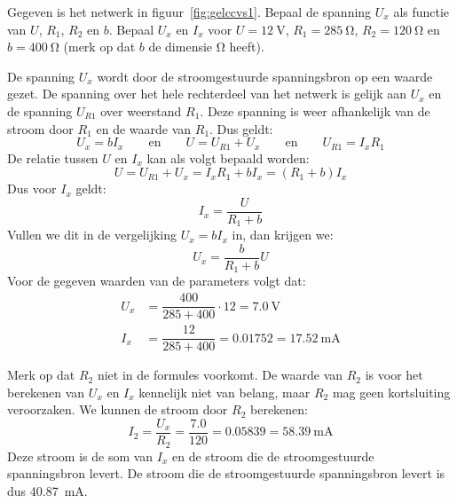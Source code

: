 \begin{example}
Gegeven is het netwerk in figuur~\ref{fig:gelccvs1}. Bepaal de spanning $U_x$ als functie van $U$, $R_1$, $R_2$ en $b$. Bepaal $U_x$ en $I_x$ voor $U=\SI{12}{\volt}$, $R_1=\SI{285}{\ohm}$, $R_2=\SI{120}{\ohm}$ en $b=\SI{400}{\ohm}$ (merk op dat $b$ de dimensie \si{\ohm} heeft).

\begin{center}
\label{fig:gelccvs1}
\end{center}

De spanning $U_x$ wordt door de stroomgestuurde spanningsbron op een waarde gezet. De spanning over het hele rechterdeel van het netwerk is gelijk aan $U_x$ en de spanning $U_{R1}$ over weerstand $R_1$. Deze spanning is weer afhankelijk van de stroom door $R_1$ en de waarde van $R_1$. Dus geldt:
%
\begin{equation}
U_x = bI_x \qquad\text{en}\qquad U = U_{R1}+U_x \qquad\text{en}\qquad U_{R1} = I_xR_1
\end{equation}
%
De relatie tussen $U$ en $I_x$ kan als volgt bepaald worden:
%
\begin{equation}
U = U_{R1} + U_x = I_xR_1 + bI_x = (R_1+b)I_x
\end{equation}
%
Dus voor $I_x$ geldt:
%
\begin{equation}
I_x = \dfrac{U}{R_1+b}
\end{equation}
%
Vullen we dit in de vergelijking $U_x = bI_x$ in, dan krijgen we:
\begin{equation}
U_x = \dfrac{b}{R_1+b}U
\end{equation}
%
Voor de gegeven waarden van de parameters volgt dat:
%
\begin{equation}
\begin{split}
U_x &= \dfrac{400}{285+400}\cdot12 = \SI{7.0}{\volt} \\
I_x &= \dfrac{12}{285+400} = \num{0.01752} = \SI{17.52}{\mA}
\end{split}
\end{equation}

Merk op dat $R_2$ niet in de formules voorkomt. De waarde van $R_2$ is voor het berekenen van $U_x$ en $I_x$ kennelijk niet van belang, maar $R_2$ mag geen kortsluiting veroorzaken. We kunnen de stroom door $R_2$ berekenen:
%
\begin{equation}
I_2 = \dfrac{U_x}{R_2} = \dfrac{\num{7.0}}{\num{120}} = \num{0.05839} = \SI{58,39}{\mA}
\end{equation}
%
Deze stroom is de som van $I_x$ en de stroom die de stroomgestuurde spanningsbron levert. De stroom die de stroomgestuurde spanningsbron levert is dus \SI{40.87}{\mA}. 
\end{example}

